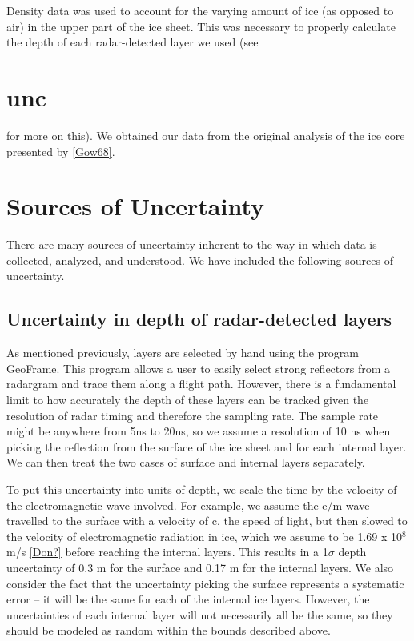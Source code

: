 \documentclass[draft,jgrga]{agutex}
\begin{document}
Density data was used to account for the varying amount of ice (as
opposed to air) in
the upper part of the ice sheet. This was necessary to properly
calculate the depth of each radar-detected layer we used (see
\section{unc} for more on this). We obtained our data from the
original analysis of the ice core presented by \ref{Gow68}.




\section{Sources of Uncertainty}\label{unc}
There are many sources of uncertainty inherent to the way in which
data is collected, analyzed, and understood. We have included the
following sources of uncertainty.

\subsection{Uncertainty in depth of radar-detected layers}

As mentioned previously, layers are selected by hand using the program
GeoFrame. This program allows a user to easily select strong
reflectors from a radargram and trace them along a flight
path. However, there is a fundamental limit to how accurately the
depth of these layers can be tracked given the resolution of radar
timing and therefore the sampling rate. The sample rate might be
anywhere from 5ns to 20ns, so we assume a resolution of 
10 ns when picking the reflection
from the surface of the ice sheet and for each internal
layer. We can then treat the two cases of surface and internal layers
separately.

To put this uncertainty into units of depth, we scale the time by
the velocity of the electromagnetic wave involved. For example, we
assume the e/m wave travelled to the surface with a velocity of c, the
speed of light, but then slowed to the velocity of electromagnetic
radiation in ice, which we assume to be 1.69 x 10$^8$ m/s \ref{Don?}
before reaching the internal layers. This results in a 1$\sigma$ depth
uncertainty of 0.3 m for the surface and 0.17 m for the internal
layers. We also consider the fact that the uncertainty picking the
surface represents a systematic error -- it will be the same for each
of the internal ice layers. However, the uncertainties of each
internal layer will not necessarily all be the same, so they should be
modeled as random within the bounds described above.
\end{document}
